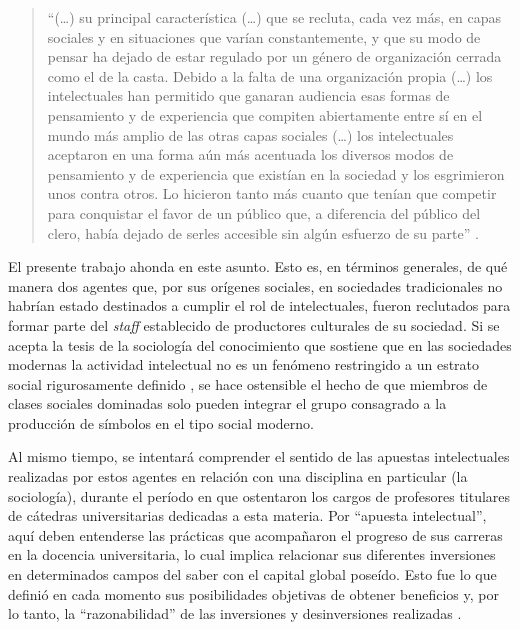 \begin{quote}
\enquote{(\dots) su principal característica (\dots) que se recluta, cada vez más, en capas sociales y en situaciones que varían constantemente, y que su modo de pensar ha dejado de estar regulado por un género de organización cerrada como el de la casta. Debido a la falta de una organización propia (\dots) los intelectuales han permitido que ganaran audiencia esas formas de pensamiento y de experiencia que compiten abiertamente entre sí en el mundo más amplio de las otras capas sociales (\dots) los intelectuales aceptaron en una forma aún más acentuada los diversos modos de pensamiento y de experiencia que existían en la sociedad y los esgrimieron unos contra otros. Lo hicieron tanto más cuanto que tenían que competir para conquistar el favor de un público que, a diferencia del público del clero, había dejado de serles accesible sin algún esfuerzo de su parte} \parencite[10-11]{1707-MANNHEIM1986}.
\end{quote}

El presente trabajo ahonda en este asunto. Esto es, en términos generales, de qué manera dos agentes que, por sus orígenes sociales, en sociedades tradicionales no habrían estado destinados a cumplir el rol de intelectuales, fueron reclutados para formar parte del \emph{staff} establecido de productores culturales de su sociedad. Si se acepta la tesis de la sociología del conocimiento que sostiene que en las sociedades modernas la actividad intelectual no es un fenómeno restringido a un estrato social rigurosamente definido \parencite{1513-SHILS1976,1521-BAUMAN1997,1576-BOURDIEU1999,1708-MANNHEIM1957}, se hace ostensible el hecho de que miembros de clases sociales dominadas solo pueden integrar el grupo consagrado a la producción de símbolos en el tipo social moderno.

Al mismo tiempo, se intentará comprender el sentido de las apuestas intelectuales realizadas por estos agentes en relación con una disciplina en particular (la sociología), durante el período en que ostentaron los cargos de profesores titulares de cátedras universitarias dedicadas a esta materia. Por \enquote{apuesta intelectual}, aquí deben entenderse las prácticas que acompañaron el progreso de sus carreras en la docencia universitaria, lo cual implica relacionar sus diferentes inversiones en determinados campos del saber con el capital global poseído. Esto fue lo que definió en cada momento sus posibilidades objetivas de obtener beneficios y, por lo tanto, la \enquote{razonabilidad} de las inversiones y desinversiones realizadas \parencite{1576-BOURDIEU1999}.

